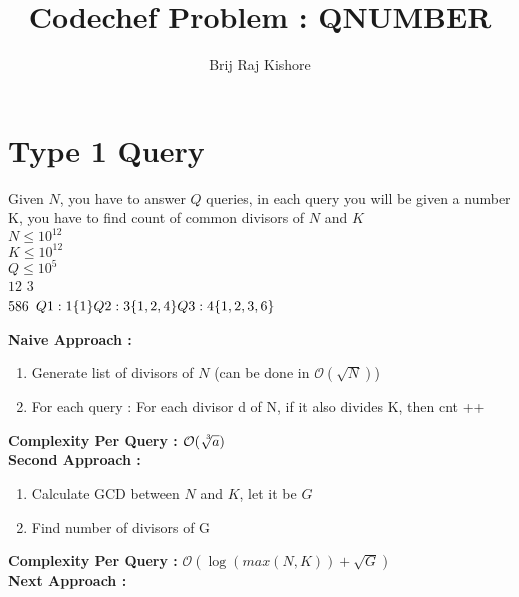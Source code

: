 \documentclass[12pt]{article}
\title{Codechef Problem : QNUMBER}
\date{}
\author{Brij Raj Kishore}
\begin{document}
    \maketitle
    \section{Type 1 Query}
	Given $N$, you have to answer $Q$ queries, in each query you will be given a number K, you have to find count of common divisors of $N$ and $K$ \\
	$N \leq 10^{12}$ \\
	$K \leq 10^{12}$ \\
	$Q \leq 10^5$ \\
	$12$ $3$ \\
	$5 \\ 8 \\ 6 \\$
	$Q1 : 1 \{1\} \\ Q2 : 3 \{1, 2, 4\} \\ Q3 : 4 \{1, 2, 3, 6\}\\$


	\textbf{Naive Approach :} \\
	\begin{enumerate}
		\item Generate list of divisors of $N$ (can be done in $\mathcal{O}(\sqrt{N})$) 
		\item For each query : For each divisor d of N, if it also divides K, then cnt ++
	\end{enumerate}

	\textbf{Complexity Per Query : } $\mathcal{O}(\sqrt[\leftroot{-3}\uproot{3}3]{a})$ \\


	\textbf{Second Approach : } \\
	\begin{enumerate}
		\item Calculate GCD between $N$ and $K$, let it be $G$
		\item Find number of divisors of G
	\end{enumerate}
	
	\textbf{Complexity Per Query : } $\mathcal{O}(\log(max(N, K)) + \sqrt{G})$ \\


	\textbf{Next Approach : } \\
\end{document}
